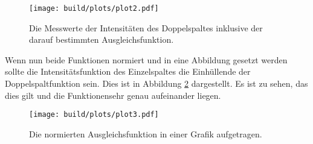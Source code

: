   \begin{figure}[H]
    \centering
    \texttt{[image: build/plots/plot2.pdf]}
    \caption{Die Messwerte der Intensitäten des Doppelspaltes inklusive der darauf bestimmten Ausgleichsfunktion.}
    \label{fig:plot2}
  \end{figure}
  \noindent Wenn nun beide Funktionen normiert und in eine Abbildung gesetzt werden sollte die Intensitätsfunktion des Einzelspaltes die Einhüllende der Doppelspaltfunktion sein.
  Dies ist in Abbildung \ref{fig:plot3} dargestellt. Es ist zu sehen, das dies gilt und die Funktionensehr genau aufeinander liegen.
  
  \begin{figure}[ht]
      \centering
      \texttt{[image: build/plots/plot3.pdf]}
      \caption{Die normierten Ausgleichsfunktion in einer Grafik aufgetragen.}
      \label{fig:plot3}
    \end{figure}

